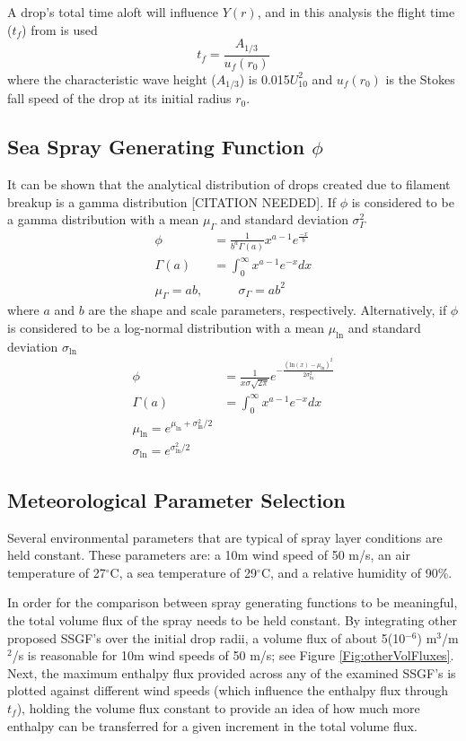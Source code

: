 \documentclass[17pt,a4paper]{article}
\begin{document}
A drop's total time aloft will influence $Y(r)$, and in this analysis the flight time ($t_f$) from \citet{Andreas1992} is used
\begin{equation}
t_f = \frac{A_{1/3}}{u_f(r_0)}\label{tofU10}
\end{equation}
where the characteristic wave height ($A_{1/3}$) is 0.015$U_{10}^2$ and $u_f(r_0)$ is the Stokes fall speed of the drop at its initial radius $r_0$. 
\subsection{Sea Spray Generating Function $\phi$}
It can be shown that the analytical distribution of drops created due to filament breakup is a gamma distribution [CITATION NEEDED]. 
If $\phi$ is considered to be a gamma distribution with a mean $\mu_\Gamma$ and standard deviation $\sigma_\Gamma^2$ 
\begin{align}
\phi &= \frac{1}{b^a\Gamma(a)}x^{a-1}e^{\frac{-x}{b}}\\
\Gamma(a) &= \int_0^\infty x^{a-1}e^{-x}dx\\
\nonumber \mu_\Gamma = ab ,&\qquad \sigma_\Gamma = ab^2
\end{align}
where $a$ and $b$ are the shape and scale parameters, respectively. Alternatively, if $\phi$ is considered to be a log-normal distribution with a mean $\mu_{\text{ln}}$ and standard deviation $\sigma_{\text{ln}}$  
\begin{align}
\phi &= \frac{1}{x\sigma \sqrt{2\pi}}e^{- \frac{ (\text{ln}(x) -\mu_{\text{ln}})^2}{2\sigma_{\text{ln}}^2}}\\
\Gamma(a) &= \int_0^\infty x^{a-1}e^{-x}dx\\
\nonumber \mu_{\text{ln}} = e^{\mu_{\text{ln}}+\sigma_{\text{ln}}^2/2}\\
 \sigma_{\text{ln}} =  e^{\sigma_{\text{ln}}^2/2}
\end{align}
\subsection{Meteorological Parameter Selection}
Several environmental parameters that are typical of spray layer conditions are held constant. These parameters are: a 10m wind speed of 50 m/s, an air temperature of 27$^{\circ}$C, a sea temperature of 29$^{\circ}$C, and a relative humidity of 90\%. \par
In order for the comparison between spray generating functions to be meaningful, the total volume flux of the spray needs to be held constant. By integrating other proposed SSGF's over the initial drop radii, a volume flux of about 5(10$^{-6}$) m$^3$/m$^2$/s is reasonable for 10m wind speeds of 50 m/s; see Figure \ref{Fig:otherVolFluxes}. Next, the maximum enthalpy flux provided across any of the examined SSGF's is plotted against different wind speeds (which influence the enthalpy flux through $t_f$), holding the volume flux constant to provide an idea of how much more enthalpy can be transferred for a given increment in the total volume flux.
\end{document}
